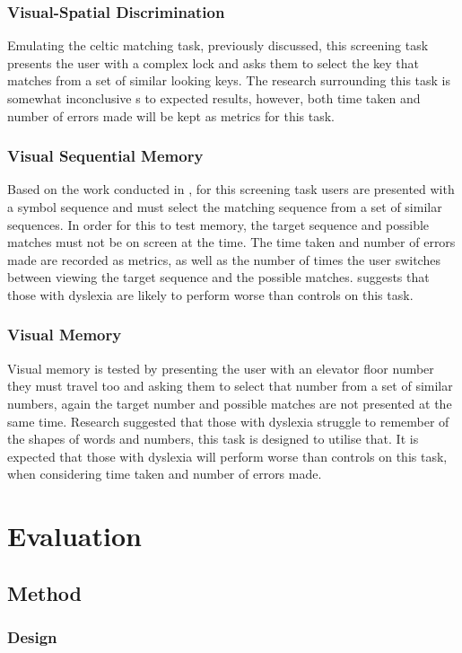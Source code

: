 \documentclass[journal]{IEEEtran}
\begin{document}
\subsubsection{Visual-Spatial Discrimination} 
Emulating the celtic matching task, previously discussed, this screening task presents the user with a complex lock and asks them to select the key that matches from a set of similar looking keys. The research surrounding this task is somewhat inconclusive s to expected results, however, both time taken and number of errors made will be kept as metrics for this task.

\subsubsection{Visual Sequential Memory} 
Based on the work conducted in \cite{sequential}, for this screening task users are presented with a symbol sequence and must select the matching sequence from a set of similar sequences. In order for this to test memory, the target sequence and possible matches must not be on screen at the time. The time taken and number of errors made are recorded as metrics, as well as the number of times the user switches between viewing the target sequence and the possible matches.
\cite{sequential} suggests that those with dyslexia are likely to perform worse than controls on this task.

\subsubsection{Visual Memory}
Visual memory is tested by presenting the user with an elevator floor number they must travel too and asking them to select that number from a set of similar numbers, again the target number and possible matches are not presented at the same time. Research suggested that those with dyslexia struggle to remember of the shapes of words and numbers, this task is designed to utilise that. It is expected that those with dyslexia will perform worse than controls on this task, when considering time taken and number of errors made.

\section{Evaluation}
\subsection{Method}
\subsubsection{Design}
\end{document}
